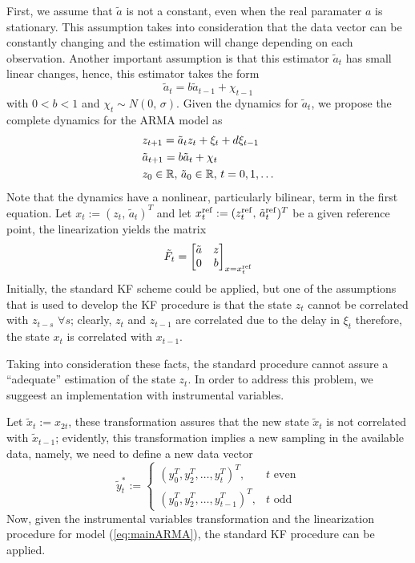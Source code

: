 First, we assume that $\tilde{a}$ is not a constant, even when the real paramater $a$ is stationary. This assumption takes into consideration that the data vector can be constantly changing and the estimation will change depending on each observation. Another important assumption is that this estimator $\tilde{a}_t$ has small linear changes, hence, this estimator takes the form
\begin{equation}
  \tilde{a}_t=b\tilde{a}_{t-1}+\chi_{t-1}
\end{equation}
with $0<b<1$ and $\chi_t \sim N(0,\,\sigma)$. Given the dynamics for $\tilde{a}_t$, we propose the complete dynamics for the ARMA model as
\begin{equation}\label{eq:mainARMA}
  \begin{split}
    &z_{t+1}=\tilde{a}_tz_t+\xi_t+d\xi_{t-1}\\
    &\tilde{a}_{t+1}=b\tilde{a}_t+\chi_t\\
    &z_0\in\R,\,\tilde{a}_0\in\R,\,t=0,1,\dots
  \end{split}
\end{equation}
Note that the dynamics have a nonlinear, particularly bilinear, term in the first equation. Let $x_t:=(z_t,\,\tilde{a}_t)^T$ and let $x^{{\rm ref}}_t:=(z_t^{{\rm ref}},\,\tilde{a}_t^{{\rm ref}})^T$ be a given reference point, the linearization yields the matrix
\[
\tilde{F}_t = \begin{bmatrix}
\tilde{a} & z\\
0 & b
\end{bmatrix}_{x=x_t^{{\rm ref}}}
\]
Initially, the standard KF scheme could be applied, but one of the assumptions that is used to develop the KF procedure is that the state $z_t$ cannot be correlated with $z_{t-s}$ $\forall s$; clearly, $z_t$ and $z_{t-1}$ are correlated due to the delay in $\xi_t$ therefore, the state $x_t$ is correlated with $x_{t-1}$.

Taking into consideration these facts, the standard procedure cannot assure a ``adequate'' estimation of the state $z_t$. In order to address this problem, we suggeest an implementation with instrumental variables.

Let $\tilde{x}_t:=x_{2t}$, these transformation assures that the new state $\tilde{x}_t$ is not correlated with $\tilde{x}_{t-1}$; evidently, this transformation implies a new sampling in the available data, namely, we need to define a new data vector
 \[\tilde{y}_t^*:=\begin{cases}
   (y_0^T, y_2^T,\ldots,y_t^T)^T,&t\text{ even}\\
   (y_0^T, y_2^T,\ldots,y_{t-1}^T)^T,&t\text{ odd}
 \end{cases}\]
Now, given the instrumental variables transformation and the linearization procedure for model (\ref{eq:mainARMA}), the standard KF procedure can be applied.
